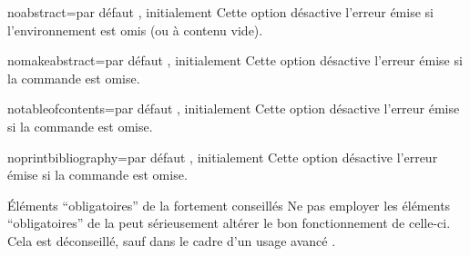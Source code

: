 \begin{description}
\begin{docKey}{noabstract}{=\textbar{}}{par
      défaut , initialement }
    Cette option désactive l'erreur émise si l'environnement 
    est omis (ou à contenu vide).
  \end{docKey}
  \begin{docKey}{nomakeabstract}{=\textbar{}}{par
      défaut , initialement }
    Cette option désactive l'erreur émise si la commande 
    est omise.
  \end{docKey}
  \begin{docKey}{notableofcontents}{=\textbar{}}{par
      défaut , initialement }
    Cette option désactive l'erreur émise si la commande
     est omise.
  \end{docKey}
  \begin{docKey}{noprintbibliography}{=\textbar{}}{par
      défaut , initialement }
    Cette option désactive l'erreur émise si la commande
     est omise.
  \end{docKey}
\end{description}

\begin{dbwarning}{Éléments \enquote{obligatoires} de la \yatcl{}
    fortement conseillés}{}
  Ne pas employer les éléments \enquote{obligatoires} de la \yatcl{} peut
  sérieusement altérer le bon fonctionnement de celle-ci. Cela est déconseillé,
  sauf dans le cadre d'un usage avancé .
\end{dbwarning}

